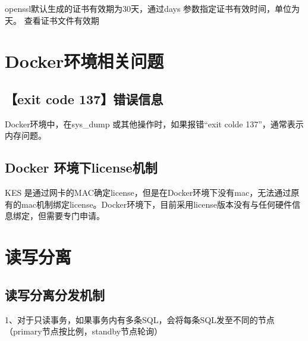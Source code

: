 \documentclass[a4,10pt,oneside,english]{sphinxmanual}
\let\sphinxpxdimen\pdfpxdimen\else\newdimen\sphinxpxdimen
\begin{document}
openssl默认生成的证书有效期为30天，通过\sphinxhyphen{}days 参数指定证书有效时间，单位为天。
查看证书文件有效期

\begin{sphinxVerbatim}[commandchars=\\\{\}]
     
\end{sphinxVerbatim}


\chapter{Docker环境相关问题}
\label{\detokenize{docker:docker}}\label{\detokenize{docker::doc}}

\section{【exit code 137】错误信息}
\label{\detokenize{docker:exit-code-137}}
Docker环境中，在sys\_dump 或其他操作时，如果报错“exit colde 137”，通常表示内存问题。

\begin{figure}[H]
\centering

\noindent\sphinxincludegraphics[width=554\sphinxpxdimen,height=92\sphinxpxdimen]{{FAQ34211}.png}
\end{figure}


\section{Docker 环境下license机制}
\label{\detokenize{docker:docker-license}}
KES 是通过网卡的MAC确定license，但是在Docker环境下没有mac，无法通过原有的mac机制绑定license。Docker环境下，目前采用license版本没有与任何硬件信息绑定，但需要专门申请。


\chapter{读写分离}
\label{\detokenize{high-availability:id1}}\label{\detokenize{high-availability::doc}}

\section{读写分离分发机制}
\label{\detokenize{high-availability:id2}}
1、对于只读事务，如果事务内有多条SQL，会将每条SQL发至不同的节点（primary节点按比例，standby节点轮询）
\end{document}
